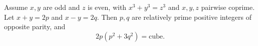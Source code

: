 Assume $x, y$ are odd and $z$ is even, with $x^3 + y^3 = z^3$ and $x, y, z$ pairwise coprime. Let $x + y = 2p$ and $x - y = 2q$. Then $p, q$ are relatively prime positive integers of opposite parity, and
$$2p(p^2 + 3q^2) = \text{cube}.$$
